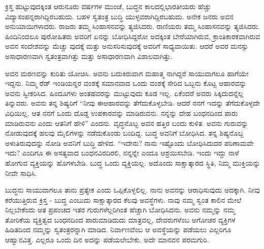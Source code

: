 ಕ್ರಿಸ್ತ ಹುಟ್ಟುವುದಕ್ಕಿಂತ ಆರುನೂರು ವರ್ಷಗಳ ಮುಂಚೆ, ಬುದ್ಧನ ಕಾಲದಲ್ಲಿ\break ಭಾರತೀಯರು ಹೆಚ್ಚು ವಿದ್ಯಾಸಂಪನ್ನರಾಗಿದ್ದಿರಬಹುದು. ಬಹಳ ಸ್ವತಂತ್ರ ಬುದ್ಧಿ ಯುಳ್ಳವರಾಗಿದ್ದಿರಬಹುದು. ಅನೇಕ ಜನರು ಅವನ ಅನುಯಾಯಿಗಳಾದರು. ರಾಜರು ತಮ್ಮ ಸಿಂಹಾಸನವನ್ನು ತ್ಯಜಿಸಿದರು. ರಾಣಿಯರು ತಮ್ಮ ಸಿಂಹಾಸನವನ್ನು ತ್ಯಜಿಸಿದರು. ಹಿಂದಿನಿಂದಲೂ ಪುರೋಹಿತರು ಅವರಿಗೆ ಏನನ್ನು ಬೋಧಿಸಿದ್ದರೋ ಅದಕ್ಕಿಂತ ಬೇರೆಯಾಗಿರುವ, ಕ್ರಾಂತಿಕಾರಕವಾಗಿರುವ ಅವನ ಸಂದೇಶವನ್ನು ಮೆಚ್ಚು ವುದಕ್ಕೆ ಮತ್ತು ಅನುಸರಿಸುವುದಕ್ಕೆ ಅವರಿಗೆ ಸಾಧ್ಯವಾಯಿತು. ಆದರೆ ಅವರ ಮನಸ್ಸು ಅಸಾಧಾರಣವಾಗಿ ಸ್ವತಂತ್ರವಾಗಿತ್ತು ಮತ್ತು ಅಸಾಧಾರಣವಾಗಿ ವಿಶಾಲವಾಗಿತ್ತು.

ಅವನ ಮರಣವನ್ನು ಕುರಿತು ಯೋಚಿಸಿ. ಅವನು ಬದುಕಿರುವಾಗ ಮಹಾತ್ಮ ನಾಗಿದ್ದರೆ ಸಾಯುವಾಗಲೂ ಹಾಗೆಯೇ ಇದ್ದನು. ನಿಮ್ಮ ರೆಡ್​ ಇಂಡಿಯನ್ನರ ವಂಶಕ್ಕೆ ಸಮಾನವಾದ ಒಂದು ವಂಶಕ್ಕೆ ಸೇರಿದ ಒಬ್ಬನು ಕೊಟ್ಟ ಆಹಾರವನ್ನು ಅವನು ಸ್ವೀಕರಿಸಿದ. ಹಿಂದೂಗಳು ಅಂತಹವರನ್ನು ಮುಟ್ಟುವುದು ಕೂಡ ಇಲ್ಲ. ಏಕೆಂದರೆ ಅವರು ಸಿಕ್ಕಿದುದನ್ನೆಲ್ಲ ತಿನ್ನುವರು. ಅವನು ತನ್ನ ಶಿಷ್ಯರಿಗೆ “ನೀವು ಈಆಹಾರವನ್ನು ತೆಗೆದುಕೊಳ್ಳಬೇಡಿ. ಆದರೆ ನನಗೆ ಇದನ್ನು ತೆಗೆದುಕೊಳ್ಳದೇ ವಿಧಿಯಿಲ್ಲ. ಆತ ನನಗೆ ಒಂದು ದೊಡ್ಡ ಉಪಕಾರವನ್ನು ಮಾಡಿರುವನು. ನನ್ನನ್ನು ದೇಹ ಬಂಧನದಿಂದ ಪಾರು ಮಾಡಿರುವನು ಎಂದು ಆತನಿಗೆ ಹೇಳಿ” ಎಂದನು. ವೃದ್ಧನೊಬ್ಬ ಅವನ ಹತ್ತಿರ ಬಂದು ಕುಳಿತ. ಅವನು ಗುರುವನ್ನು ನೋಡುವುದಕ್ಕೆ ಹಲವು ಮೈಲಿಗಳನ್ನು ನಡೆದುಕೊಂಡು ಬಂದಿದ್ದ. ಬುದ್ಧ ಅವನಿಗೆ ಬೋಧಿಸಿದ. ತನ್ನ ಶಿಷ್ಯನೊಬ್ಬ ಅಳುತಿರುವುದನ್ನು ನೋಡಿ ಅವನಿಗೆ ಬುದ್ಧಿ ಹೇಳಿದ. “ಇದೇನು? ನಾನು ಇಷ್ಟೊಂದು ಬೋಧಿಸಿದುದರ ಪರಿಣಾಮವೇ ಇದು? ಎಂದಿಗೂ ಈ ಅಸತ್ಯವಾದ ಬಂಧನವಿರದಿರಲಿ, ನನ್ನನ್ನೇ ಎಂದೂ ಆಶ್ರಯಿಸಬೇಡಿ. ಇಂದು ಇದ್ದು ನಾಳೆ ಹೋಗುವ ವ್ಯಕ್ತಿಯನ್ನು ಹೊಗಳಬೇಡಿ. ಬುದ್ಧ ಒಂದು ವ್ಯಕ್ತಿಯಲ್ಲ. ಅದೊಂದು ಸಾಕ್ಷಾತ್ಕಾರದ ಸ್ಥಿತಿ, ನಿಮ್ಮ ಮುಕ್ತಿಯನ್ನು ನೀವೇ ಸಾಧಿಸಿ.

ಬುದ್ಧನು ಸಾಯುವಾಗಲೂ ತಾನು ಪ್ರತ್ಯೇಕ ಎಂದು ಒಪ್ಪಿಕೊಳ್ಳಲಿಲ್ಲ. ನಾನು ಅವನನ್ನು ಆರಾಧಿಸುವುದು ಅದಕ್ಕಾಗಿ. ನೀವು ಕರೆಯುತ್ತಿರುವ ಕ್ರಿಸ್ತ - ಬುದ್ಧ ಎಂಬುದು ಸಾಕ್ಷಾತ್ಕಾರದ ಕೆಲವು ಅವಸ್ಥೆಗಳು. ನಾವು ನಮ್ಮ ಸ್ವಂತ ಕಾಲಿನ ಮೇಲೆ ನಿಲ್ಲಬೇಕೆಂದು ಆತ ಪ್ರಪಂಚದ ಇತರ ಗುರುಗಳೆಲ್ಲರಿಗಿಂತ ಹೆಚ್ಚಾಗಿ ಬೋಧಿಸಿದನು. ಅವನು ನಮ್ಮನ್ನು ನಮ್ಮ ತೋರಿಕೆಯ ವ್ಯಕ್ತಿತ್ವದ ಬಂಧನದಿಂದ ಪಾರುಮಾಡಿದುದು ಮಾತ್ರವಲ್ಲ, ದೇವರುಗಳೆಂಬ ಅಗೋಚರ ವ್ಯಕ್ತಿಗಳ ಹಿಡಿತದಿಂದ ನಮ್ಮನ್ನು ಸ್ವತಂತ್ರರನ್ನಾಗಿ ಮಾಡಿದ. ನಿರ್ವಾಣವೆಂಬ ಆ ಅವಸ್ಥೆಯನ್ನು ಪಡೆಯಲು ಎಲ್ಲರಿಗೂ ಆಹ್ವಾನವಿತ್ತ. ಎಲ್ಲರೂ ಒಂದು ದಿನ ಅದನ್ನು ಪಡೆಯಲೇಬೇಕು. ಅದೇ ಮಾನವನ ಪರಮಗುರಿ.


